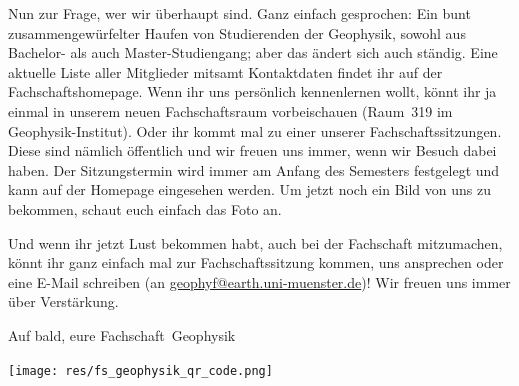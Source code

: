 \begin{multicols*}{2}
Nun zur Frage, wer wir überhaupt sind.
Ganz einfach gesprochen:
Ein bunt zusammengewürfelter Haufen von Studierenden der Geophysik, sowohl aus Bachelor- als auch Master-Studiengang; aber das ändert sich auch ständig.
Eine aktuelle Liste aller Mitglieder mitsamt Kontaktdaten findet ihr auf der Fachschaftshomepage.
Wenn ihr uns persönlich kennenlernen wollt, könnt ihr ja einmal in unserem neuen Fachschaftsraum vorbeischauen (Raum~319 im Geophysik-Institut).
Oder ihr kommt mal zu einer unserer Fachschaftssitzungen.
Diese sind nämlich öffentlich und wir freuen uns immer, wenn wir Besuch dabei haben.
Der Sitzungstermin wird immer am Anfang des Semesters festgelegt und kann auf der Homepage eingesehen werden.
Um jetzt noch ein Bild von uns zu bekommen, schaut euch einfach das Foto an.

Und wenn ihr jetzt Lust bekommen habt, auch bei der Fachschaft mitzumachen, könnt ihr ganz einfach mal zur Fachschaftssitzung kommen, uns ansprechen oder eine E-Mail schreiben (an \url{geophyf@earth.uni-muenster.de})!
Wir freuen uns immer über Verstärkung.

Auf bald, eure Fachschaft~Geophysik

\begin{center}
	\texttt{[image: res/fs\_geophysik\_qr\_code.png]}
\end{center}
\end{multicols*}

